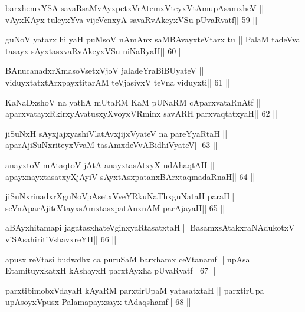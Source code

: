 \begin{shl}
barxhemxYSA savaRsaMvAyxpetxVrAtemxVteyxVtAmupAsamxheV ||
vAyxKAyx tuleyxYva vijeVcnxyA savaRvAkeyxVSu pUvaRvatf\hfill || 59 ||
\end{shl}

\begin{shl}
guNoV yatarx hi yaH puMsoV nAmAnx saMBAvayxteV\s tarx tu ||
PalaM tadeVva tasayx sAyxtasxvaRvAkeyxVSu niNaRyaH\hfill || 60 ||
\end{shl}

\begin{shl}
BAnucanadxrXmasoVsetxVjoV jaladeYraBiBUyateV ||
viduyxtatxtArxpayxtitarAM teVjasivxV teVna viduyxti\hfill || 61 ||
\end{shl}

\begin{shl}
KaNaDxshoV na yathA mUtaRM KaM pUNaRM cAparxvataRnAtf ||
aparxvatayxRkirxyAvatusxyXvoyxVRminx savARH parxvaqtatxyaH\hfill || 62 ||
\end{shl}

\begin{shl}
jiSuNxH sAyxjajxyashiVlatAvxjijxVyateV na pareYyaRtaH ||
aparAjiSuNxriteyxVvaM tasAmxdeVvABidhiVyateV\hfill || 63 ||
\end{shl}

\begin{shl}
anayxtoV mAtaqtoV jAtA anayxtasAtxyX udAhaqtAH ||
apayxnayxtasatxyXjAyiV sAyxtAsxpatanxBArxtaqmadaRnaH\hfill || 64 ||
\end{shl}

\begin{shl}
jiSuNxrinadxrXguNoVpAsetxVveYRkuNaThxguNataH paraH||
seVnA\s parAjiteVtayxsAmxtasxpatAnxnAM parAjayaH\hfill || 65 ||
\end{shl}

\begin{shl}
aBAyxhitamapi jagatasxhateV\s ginxyaRtasatxtaH ||
BasamxsAtakxraNAdukotxV viSAsahiritiVshavxreYH\hfill || 66 ||
\end{shl}

\begin{shl}
apusx reVtasi budwdhx ca puruSaM barxhamx ceVtanamf ||
upAsa EtamituyxkatxH kAshayxH parxtAyxha pUvaRvatf\hfill || 67 ||
\end{shl}

\begin{shl}
parxtibimobxVdayaH kAyaRM parxtirUpaM yatasatxtaH ||
parxtirUpa upAsoyxV\s pusx Palamapayxsayx tAdaqshamf\hfill || 68 ||
\end{shl}

